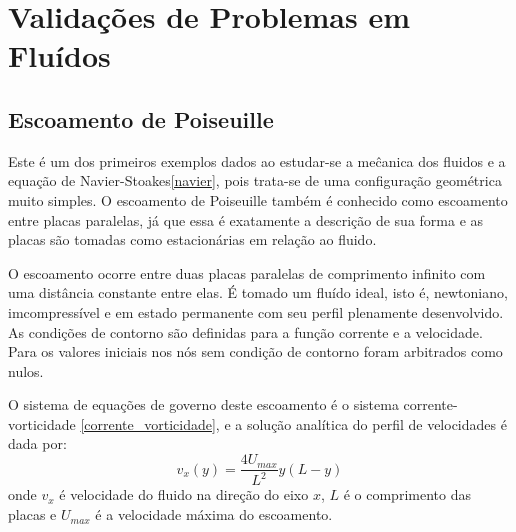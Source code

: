 \section{\textbf{Validações de Problemas em Fluídos}}
\label{sec_fluidos}
\subsection{\textbf{Escoamento de Poiseuille}}
\label{sec_poiseuille}
Este é um dos primeiros exemplos dados ao estudar-se a meĉanica dos fluidos e a equação de Navier-Stoakes\eqref{navier}, pois trata-se de uma configuração geométrica muito simples.
O escoamento de Poiseuille também é conhecido como escoamento entre placas paralelas, já que essa é exatamente a descrição de sua forma e as placas são tomadas como estacionárias em relação ao fluido.

O escoamento ocorre entre duas placas paralelas de comprimento infinito com uma distância constante entre elas.
É tomado um fluído ideal, isto é, newtoniano, imcompressível e em estado permanente com seu perfil plenamente desenvolvido.
As condições de contorno são definidas para a função corrente e a velocidade.
Para os valores iniciais nos nós sem condição de contorno foram arbitrados como nulos.

O sistema de equações de governo deste escoamento é o sistema corrente-vorticidade \ref{corrente_vorticidade}, e a solução analítica do perfil de velocidades é dada por\cite{pontes_norberto}:
\begin{equation}
    v_x(y) = \dfrac{4U_{max}}{L^2}y(L-y)
    \label{poiseuille_sol} 
\end{equation}
onde $v_x$ é velocidade do fluido na direção do eixo $x$, $L$ é o comprimento das placas e $U_{max}$ é a velocidade máxima do escoamento.

